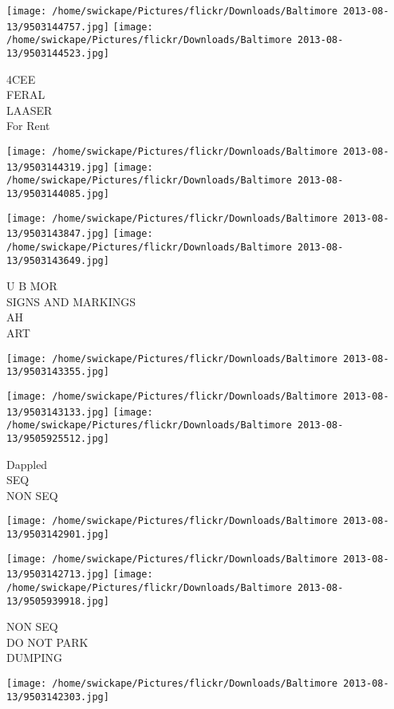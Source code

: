 \documentclass[10pt,letterpaper]{article}
\begin{document}
\texttt{[image: /home/swickape/Pictures/flickr/Downloads/Baltimore 2013-08-13/9503144757.jpg]}
\texttt{[image: /home/swickape/Pictures/flickr/Downloads/Baltimore 2013-08-13/9503144523.jpg]}

4CEE\\
FERAL\\
LAASER\\
For Rent
\pagebreak

\texttt{[image: /home/swickape/Pictures/flickr/Downloads/Baltimore 2013-08-13/9503144319.jpg]}
\texttt{[image: /home/swickape/Pictures/flickr/Downloads/Baltimore 2013-08-13/9503144085.jpg]}

\texttt{[image: /home/swickape/Pictures/flickr/Downloads/Baltimore 2013-08-13/9503143847.jpg]}
\texttt{[image: /home/swickape/Pictures/flickr/Downloads/Baltimore 2013-08-13/9503143649.jpg]}

U B MOR\\
SIGNS AND MARKINGS\\
AH\\
ART
\pagebreak

\texttt{[image: /home/swickape/Pictures/flickr/Downloads/Baltimore 2013-08-13/9503143355.jpg]}

\vspace{0.25in}
\texttt{[image: /home/swickape/Pictures/flickr/Downloads/Baltimore 2013-08-13/9503143133.jpg]}
\texttt{[image: /home/swickape/Pictures/flickr/Downloads/Baltimore 2013-08-13/9505925512.jpg]}

Dappled\\
SEQ\\
NON SEQ
\pagebreak

\texttt{[image: /home/swickape/Pictures/flickr/Downloads/Baltimore 2013-08-13/9503142901.jpg]}

\vspace{0.25in}
\texttt{[image: /home/swickape/Pictures/flickr/Downloads/Baltimore 2013-08-13/9503142713.jpg]}
\texttt{[image: /home/swickape/Pictures/flickr/Downloads/Baltimore 2013-08-13/9505939918.jpg]}

NON SEQ\\
DO NOT PARK\\
DUMPING
\pagebreak

\texttt{[image: /home/swickape/Pictures/flickr/Downloads/Baltimore 2013-08-13/9503142303.jpg]}
\end{document}
